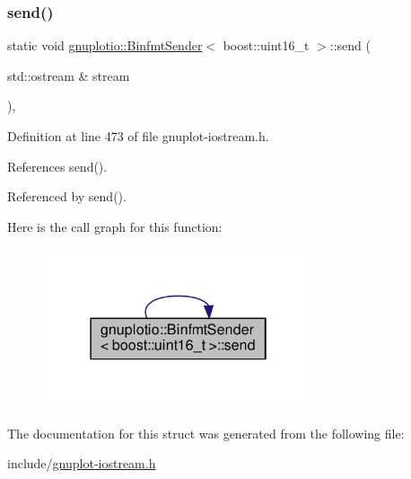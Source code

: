 \subsubsection{\texorpdfstring{send()}{send()}}
{\footnotesize\ttfamily static void \hyperlink{structgnuplotio_1_1_binfmt_sender}{gnuplotio\+::\+Binfmt\+Sender}$<$ boost\+::uint16\+\_\+t $>$\+::send (\begin{DoxyParamCaption}\item[{std\+::ostream \&}]{stream }\end{DoxyParamCaption})\hspace{0.3cm}{\ttfamily [inline]}, {\ttfamily [static]}}



Definition at line 473 of file gnuplot-\/iostream.\+h.



References send().



Referenced by send().

Here is the call graph for this function\+:\nopagebreak
\begin{figure}[H]
\begin{center}
\leavevmode
\includegraphics[width=226pt]{structgnuplotio_1_1_binfmt_sender_3_01boost_1_1uint16__t_01_4_a7bb7f0a62a21496b9e85ce35f0170717_cgraph}
\end{center}
\end{figure}


The documentation for this struct was generated from the following file\+:\begin{DoxyCompactItemize}
\item 
include/\hyperlink{gnuplot-iostream_8h}{gnuplot-\/iostream.\+h}\end{DoxyCompactItemize}
